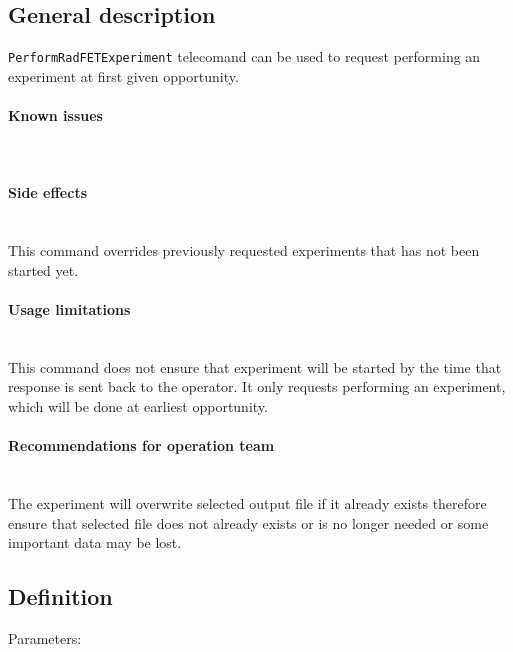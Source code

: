 

\subsection{General description}
\texttt{PerformRadFETExperiment} telecomand can be used to request performing an \radfet 
experiment at first given opportunity.

\paragraph{Known issues} \mbox{} \\
\None

\paragraph{Side effects} \mbox{} \\
This command overrides previously requested experiments that has not been started yet. 

\paragraph{Usage limitations} \mbox{} \\
This command does not ensure that \radfet experiment will be started by the time that 
response is sent back to the operator. It only requests performing an experiment, which 
will be done at earliest opportunity.

\paragraph{Recommendations for operation team} \mbox{} \\
The experiment will overwrite selected output file if it already exists therefore ensure 
that selected file does not already exists or is no longer needed or some important data
may be lost.

\subsection{Definition}

Parameters: 

\begin{tcarglist}
\end{tcarglist}

